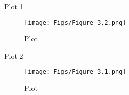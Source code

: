 \documentclass{beamer}
\begin{document}
\begin{frame}{Plot 1}
\begin{figure}
    \centering
    \texttt{[image: Figs/Figure\_3.2.png]}
    \caption{Plot}
    \label{fig:placeholder}
\end{figure}
\end{frame}

\begin{frame}{Plot 2}
\begin{figure}
    \centering
    \texttt{[image: Figs/Figure\_3.1.png]}
    \caption{Plot}
    \label{fig:placeholder}
\end{figure}
\end{frame}
\end{document}
